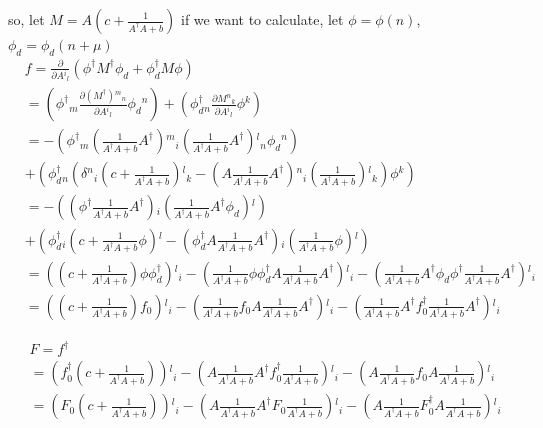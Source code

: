 so, let $M=A\left(c+\frac{1}{A^{\dagger}A+b}\right)$ if we want to calculate, let $\phi=\phi(n)$, $\phi_d=\phi_d(n+\mu)$
\begin{equation}
\begin{split}
&f=\frac{\partial}{\partial A{}^i{}_l}\left(\phi ^{\dagger} M^{\dagger}\phi_d + \phi _d^{\dagger} M \phi \right)\\    
&=\left(\phi ^{\dagger}{}_m \frac{\partial (M^{\dagger}){}^m{}_n}{\partial A{}^i{}_l}  \phi_d{}^n\right)+\left(\phi _d^{\dagger}{}_n \frac{\partial M{}^n{}_{k}  }{\partial A{}^i{}_l}  \phi {}^k\right)\\
&=-\left(\phi ^{\dagger}{}_m \left(\frac{1}{A^{\dagger}A+b}A^{\dagger}\right){}^m{}_i  \left(\frac{1}{A^{\dagger}A+b}A^{\dagger}\right){}^l{}_n  \phi_d{}^n\right)\\
&+\left(\phi _d^{\dagger}{}_n \left(\delta {}^n{}_i  \left(c+\frac{1}{A^{\dagger}A+b}\right){}^l{}_k-\left(A\frac{1}{A^{\dagger}A+b}A^{\dagger}\right){}^n{}_i  \left(\frac{1}{A^{\dagger}A+b}\right){}^l{}_k\right)  \phi {}^k\right)\\
&=-\left(\left(\phi ^{\dagger}\frac{1}{A^{\dagger}A+b}A^{\dagger}\right){}_i  \left(\frac{1}{A^{\dagger}A+b}A^{\dagger}\phi_d\right){}^l\right)\\
&+\left(\phi _d^{\dagger}{}_i  \left(c+\frac{1}{A^{\dagger}A+b}\phi \right){}^l-\left(\phi _d^{\dagger}A\frac{1}{A^{\dagger}A+b}A^{\dagger}\right){}_i  \left(\frac{1}{A^{\dagger}A+b}\phi \right){}^l\right)\\
&=\left(\left(c+\frac{1}{A^{\dagger}A+b}\right)\phi\phi _d^{\dagger}\right){}^l{}_i-\left(\frac{1}{A^{\dagger}A+b}\phi \phi _d^{\dagger}A\frac{1}{A^{\dagger}A+b}A^{\dagger}\right){}^l{}_i-\left(\frac{1}{A^{\dagger}A+b}A^{\dagger} \phi_d\phi ^{\dagger}\frac{1}{A^{\dagger}A+b}A^{\dagger}\right){}^l{}_i\\
&=\left(\left(c+\frac{1}{A^{\dagger}A+b}\right)f_0\right){}^l{}_i-\left(\frac{1}{A^{\dagger}A+b}f_0A\frac{1}{A^{\dagger}A+b}A^{\dagger}\right){}^l{}_i-\left(\frac{1}{A^{\dagger}A+b}A^{\dagger} f_0^{\dagger}\frac{1}{A^{\dagger}A+b}A^{\dagger}\right){}^l{}_i
\end{split}
\end{equation}

\begin{equation}
\begin{split}
&F=f^{\dagger}\\    
&=\left(f_0^{\dagger}\left(c+\frac{1}{A^{\dagger}A+b}\right)\right){}^l{}_i-\left(A \frac{1}{A^{\dagger}A+b} A^{\dagger}f_0^{\dagger} \frac{1}{A^{\dagger}A+b}\right){}^l{}_i-\left(A \frac{1}{A^{\dagger}A+b} f_0 A \frac{1}{A^{\dagger}A+b}\right){}^l{}_i\\
&=\left(F_0\left(c+\frac{1}{A^{\dagger}A+b}\right)\right){}^l{}_i-\left(A \frac{1}{A^{\dagger}A+b} A^{\dagger}F_0 \frac{1}{A^{\dagger}A+b}\right){}^l{}_i-\left(A \frac{1}{A^{\dagger}A+b} F_0^{\dagger} A \frac{1}{A^{\dagger}A+b}\right){}^l{}_i\\
\end{split}
\end{equation}

